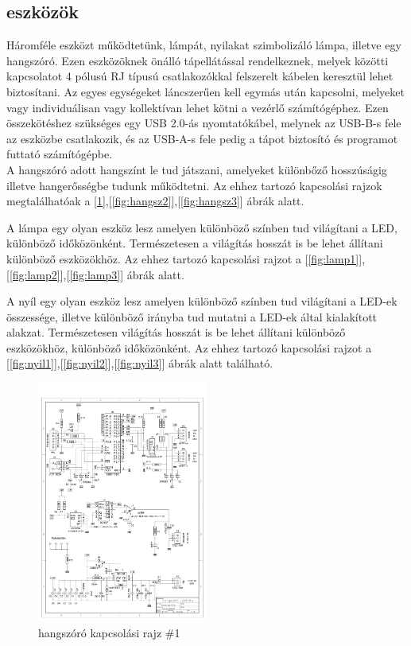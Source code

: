 \documentclass[tocnopagenum]{thesis-ekf}
\theoremstyle{definition}
\theoremstyle{remark}
\begin{document}
	\subsection*{eszközök}
	Háromféle eszközt működtetünk, lámpát, nyilakat szimbolizáló lámpa, illetve egy hangszóró.
	Ezen eszközöknek önálló tápellátással rendelkeznek, melyek közötti kapcsolatot 4 pólusú RJ típusú csatlakozókkal felszerelt kábelen keresztül lehet biztosítani. Az egyes egységeket láncszerűen kell egymás után kapcsolni, melyeket vagy individuálisan vagy kollektívan lehet kötni a vezérlő számítógéphez. Ezen összekötéshez szükséges egy USB 2.0-ás nyomtatókábel, melynek az USB-B-s fele az eszközbe csatlakozik, és az USB-A-s fele pedig a tápot biztosító és programot futtató számítógépbe.
	\\  
	A hangszóró adott hangszínt le tud játszani, amelyeket különbőző hosszúságig illetve hangerősségbe tudunk működtetni.
	Az ehhez tartozó kapcsolási rajzok megtalálhatóak a [\ref{fig:hangsz1}],[\ref{fig:hangsz2}],[\ref{fig:hangsz3}] ábrák alatt.
	\par
	A lámpa egy olyan eszköz lesz amelyen különböző színben tud világítani a LED, különböző időközönként. Természetesen a világítás hosszát is be lehet állítani különböző eszközökhöz.
	Az ehhez tartozó kapcsolási rajzot a [\ref{fig:lamp1}],[\ref{fig:lamp2}],[\ref{fig:lamp3}] ábrák alatt.
	\par
	A nyíl egy olyan eszköz lesz amelyen különböző színben tud világítani a LED-ek összessége, illetve különböző irányba tud mutatni a LED-ek által kialakított alakzat.  Természetesen  világítás hosszát is be lehet állítani különböző eszközökhöz, különböző időközönként.
Az ehhez tartozó kapcsolási rajzot a [\ref{fig:nyil1}],[\ref{fig:nyil2}],[\ref{fig:nyil3}] ábrák alatt található.\medskip
\\
	\begin{figure}[h!]
	
	\centering
	\includegraphics[page=1,width=0.5\textwidth]{SLH}
	\caption[Hangszoró]{hangszóró kapcsolási rajz \#1}
	\label{fig:hangsz1}
	
	\end{figure}
\end{document}

